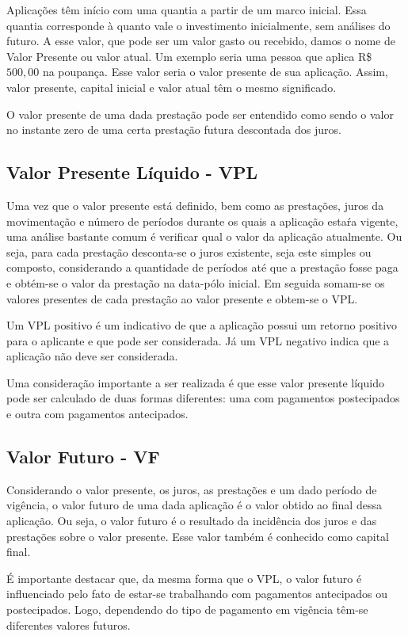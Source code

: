 Aplicações têm início com uma quantia a partir de um marco inicial. Essa quantia corresponde à quanto vale o investimento inicialmente, sem análises do futuro. A esse valor, que pode ser um valor gasto ou recebido, damos o nome de Valor Presente ou valor atual. Um exemplo seria uma pessoa que aplica R\$ $500,00$ na poupança. Esse valor seria o valor presente de sua aplicação. Assim, valor presente, capital inicial e valor atual têm o mesmo significado.

O valor presente de uma dada prestação pode ser entendido como sendo o valor no instante zero de uma certa prestação futura descontada dos juros.

\subsection{Valor Presente Líquido - VPL}

Uma vez que o valor presente está definido, bem como as prestações, juros da movimentação e número de períodos durante os quais a aplicação estaŕa vigente, uma análise bastante comum é verificar qual o valor da aplicação atualmente. Ou seja, para cada prestação desconta-se o juros existente, seja este simples ou composto, considerando a quantidade de períodos até que a prestação fosse paga e obtém-se o valor da prestação na data-pólo inicial. Em seguida somam-se os valores presentes de cada prestação ao valor presente e obtem-se o VPL.

Um VPL positivo é um indicativo de que a aplicação possui um retorno positivo para o aplicante e que pode ser considerada. Já um VPL negativo indica que a aplicação não deve ser considerada. \cite{vpl}

Uma consideração importante a ser realizada é que esse valor presente líquido pode ser calculado de duas formas diferentes: uma com pagamentos postecipados e outra com pagamentos antecipados.

\subsection{Valor Futuro - VF}

Considerando o valor presente, os juros, as prestações e um dado período de vigência, o valor futuro de uma dada aplicação é o valor obtido ao final dessa aplicação. Ou seja, o valor futuro é o resultado da incidência dos juros e das prestações sobre o valor presente. Esse valor também é conhecido como capital final.

É importante destacar que, da mesma forma que o VPL, o valor futuro é influenciado pelo fato de estar-se trabalhando com pagamentos antecipados ou postecipados. Logo, dependendo do tipo de pagamento em vigência têm-se diferentes valores futuros.

